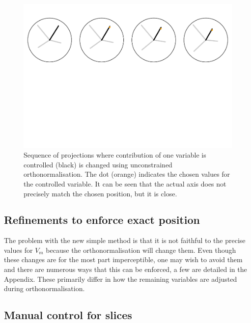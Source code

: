\documentclass[]{interact}
\theoremstyle{plain}%
\theoremstyle{definition}
\theoremstyle{remark}
\begin{document}
\begin{figure}
\includegraphics[width=1\linewidth]{arxiv_files/figure-latex/manualsequence-1} \caption{Sequence of projections where contribution of one variable is controlled (black) is changed using unconstrained orthonormalisation. The dot (orange) indicates the chosen values for the controlled variable. It can be seen that the actual axis does not precisely match the chosen position, but it is close.}\label{fig:manualsequence}
\end{figure}

\hypertarget{refinements-to-enforce-exact-position}{%
\subsection{Refinements to enforce exact
position}\label{refinements-to-enforce-exact-position}}

The problem with the new simple method is that it is not faithful to the
precise values for \(V_m\) because the orthonormalisation will change
them. Even though these changes are for the most part imperceptible, one
may wish to avoid them and there are numerous ways that this can be
enforced, a few are detailed in the Appendix. These primarily differ in
how the remaining variables are adjusted during orthonormalisation.

\hypertarget{manual-control-for-slices}{%
\subsection{Manual control for slices}\label{manual-control-for-slices}}
\end{document}
